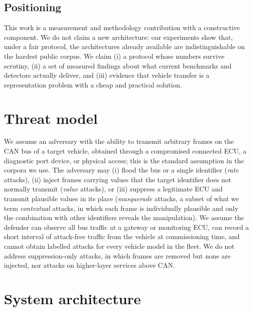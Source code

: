 \documentclass[preprint,11pt,authoryear]{elsarticle}
\begin{document}
\subsection{Positioning}

This work is a measurement and methodology contribution with a constructive component. We do not
claim a new architecture: our experiments show that, under a fair protocol, the architectures
already available are indistinguishable on the hardest public corpus. We claim (i) a protocol whose
numbers survive scrutiny, (ii) a set of measured findings about what current benchmarks and
detectors actually deliver, and (iii) evidence that vehicle transfer is a representation problem
with a cheap and practical solution.

\section{Threat model}
\label{sec:threat}

We assume an adversary with the ability to transmit arbitrary frames on the CAN bus of a target
vehicle, obtained through a compromised connected ECU, a diagnostic port device, or physical access;
this is the standard assumption in the corpora we use. The adversary may (i) flood the bus or a
single identifier (\emph{rate} attacks), (ii) inject frames carrying values that the target
identifier does not normally transmit (\emph{value} attacks), or (iii) suppress a legitimate ECU and
transmit plausible values in its place (\emph{masquerade} attacks, a subset of what we term
\emph{contextual} attacks, in which each frame is individually plausible and only the combination
with other identifiers reveals the manipulation). We assume the defender can observe all bus traffic
at a gateway or monitoring ECU, can record a short interval of attack-free traffic from the vehicle
at commissioning time, and cannot obtain labelled attacks for every vehicle model in the fleet. We
do not address suppression-only attacks, in which frames are removed but none are injected, nor
attacks on higher-layer services above CAN.

\section{System architecture}
\label{sec:arch}
\end{document}

